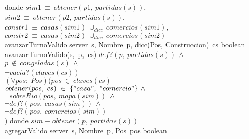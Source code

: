 \begin{Interfaz}
\tab donde $sim1\ \equiv\ obtener(p1,\ partidas(s))$, \\
\tab\tab\tab \: $sim2\ \equiv\ obtener(p2,\ partidas(s))$, \\
\tab\tab\tab \: $constr1\ \equiv\ casas(sim1)\ \cup_{dicc}\ comercios(sim1)$, \\
\tab\tab\tab \: $constr2\ \equiv\ casas(sim2)\ \cup_{dicc}\ comercios(sim2)$
\\

\tadOperacion
    {avanzarTurnoValido}
    {server\ s, Nombre\ p, dicc(Pos, Construccion)\ cs}
    {boolean}
    {}
\tadAxioma
    {avanzarTurnoValido(s,\ p,\ cs)}
    {$
        def?(p,\ partidas(s))\ \land\ $\\$
        p\ \notin\ congeladas(s)\ \land\ $\\$ 
        \neg vacia?(claves(cs))\ $\yluego\ \\$
        (\forall pos:\ Pos)(pos\ \in\ claves(cs)\ $\impluego$ $\\$
            $\tab$ obtener(pos,\ cs)\ \in\ \{"casa",\ "comercio"\}\ \land\ $\\$
            $\tab$ \neg sobreRio(pos,\ mapa(sim))\ \land\ $\\$
            $\tab$ \neg def?(pos,\ casas(sim))\ \land\ $\\$
            $\tab$ \neg def?(pos,\ comercios(sim)) $\\$
        )
    $}
\tab donde $sim \equiv obtener(p,\ partidas(s))$  
\\

\tadOperacion
    {agregarValido}
    {server\ s, Nombre\ p, Pos\ pos}
    {boolean}
    {}






\end{Interfaz}

\pagebreak
